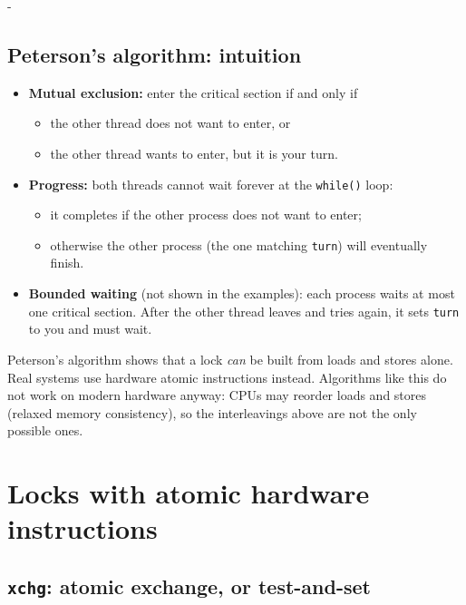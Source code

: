 \documentclass[11pt,a4paper]{article}
\makeatletter
\newcommand{\keepspace}[1]{\par\penalty-100\begingroup
  \setlength{\dimen@}{#1}\dimen@ii\pagegoal\advance\dimen@ii-\pagetotal
  \ifdim\dimen@>\dimen@ii\ifdim\dimen@ii>\z@\vfil\fi\break\fi\endgroup}
\makeatother
\begin{document}
\keepspace{16\baselineskip}
\subsection{Peterson's algorithm: intuition}

\begin{itemize}
  \item \textbf{Mutual exclusion:} enter the critical section if and only if
    \begin{itemize}
      \item the other thread does not want to enter, or
      \item the other thread wants to enter, but it is your turn.
    \end{itemize}
  \item \textbf{Progress:} both threads cannot wait forever at the
        \texttt{while()} loop:
    \begin{itemize}
      \item it completes if the other process does not want to enter;
      \item otherwise the other process (the one matching \texttt{turn})
            will eventually finish.
    \end{itemize}
  \item \textbf{Bounded waiting} (not shown in the examples): each process
        waits at most one critical section. After the other thread leaves
        and tries again, it sets \texttt{turn} to you and must wait.
\end{itemize}

\begin{warnbox}
Peterson's algorithm shows that a lock \emph{can} be built from loads and
stores alone. Real systems use hardware atomic instructions instead.
Algorithms like this do not work on modern hardware anyway: CPUs may
reorder loads and stores (relaxed memory consistency), so the
interleavings above are not the only possible ones.
\end{warnbox}

\section{Locks with atomic hardware instructions}

\subsection{\texttt{xchg}: atomic exchange, or test-and-set}
\end{document}
